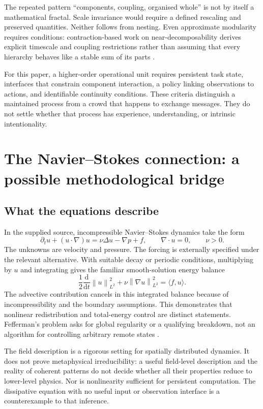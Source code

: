 \documentclass[11pt,a4paper]{article}
\theoremstyle{definition}
\theoremstyle{remark}
\newcommand{\norm}[1]{\left\lVert#1\right\rVert}
\begin{document}
The repeated pattern ``components, coupling, organised whole'' is not by itself a mathematical fractal. Scale invariance would require a defined rescaling and preserved quantities. Neither follows from nesting. Even approximate modularity requires conditions: contraction-based work on near-decomposability derives explicit timescale and coupling restrictions rather than assuming that every hierarchy behaves like a stable sum of its parts \citep{bousquet}.

For this paper, a higher-order operational unit requires persistent task state, interfaces that constrain component interaction, a policy linking observations to actions, and identifiable continuity conditions. These criteria distinguish a maintained process from a crowd that happens to exchange messages. They do not settle whether that process has experience, understanding, or intrinsic intentionality.

\section{The Navier--Stokes connection: a possible methodological bridge}\label{sec:ns}
\subsection{What the equations describe}
In the supplied source, incompressible Navier--Stokes dynamics take the form
\begin{equation}\label{eq:ns}
 \partial_t u+(u\cdot\nabla)u=\nu\Delta u-\nabla p+f,
 \qquad \nabla\cdot u=0,\qquad \nu>0.
\end{equation}
The unknowns are velocity and pressure. The forcing is externally specified under the relevant alternative. With suitable decay or periodic conditions, multiplying by $u$ and integrating gives the familiar smooth-solution energy balance
\begin{equation}\label{eq:energy}
 \frac{1}{2}\frac{\mathrm d}{\mathrm dt}\norm{u}_{L^2}^2
 +\nu\norm{\nabla u}_{L^2}^2
 =\langle f,u\rangle.
\end{equation}
The advective contribution cancels in this integrated balance because of incompressibility and the boundary assumptions. This demonstrates that nonlinear redistribution and total-energy control are distinct statements. Fefferman's problem asks for global regularity or a qualifying breakdown, not an algorithm for controlling arbitrary remote states \citep{fefferman}.

The field description is a rigorous setting for spatially distributed dynamics. It does not prove metaphysical irreducibility: a useful field-level description and the reality of coherent patterns do not decide whether all their properties reduce to lower-level physics. Nor is nonlinearity sufficient for persistent computation. The dissipative equation with no useful input or observation interface is a counterexample to that inference.
\end{document}
